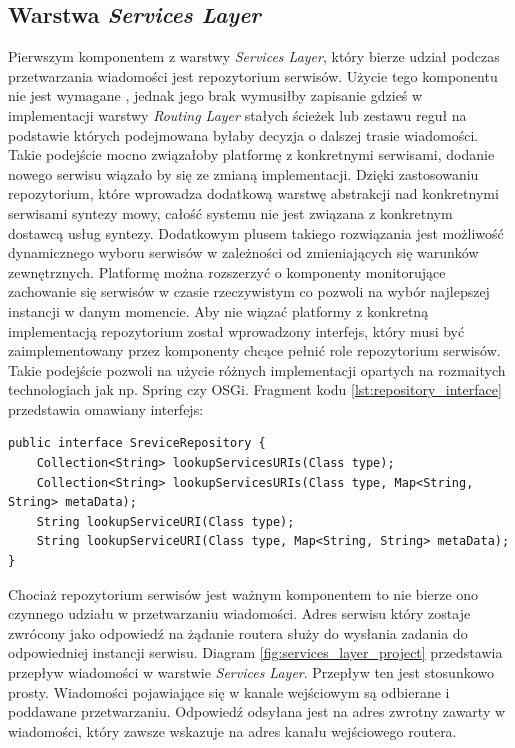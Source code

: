\subsection{Warstwa \textit{Services Layer}}

Pierwszym komponentem z warstwy \textit{Services Layer}, który bierze udział podczas przetwarzania wiadomości jest repozytorium serwisów. Użycie tego komponentu nie jest wymagane , jednak jego brak wymusiłby zapisanie gdzieś w implementacji warstwy \textit{Routing Layer} stałych ścieżek lub zestawu reguł na podstawie których podejmowana byłaby decyzja o dalszej trasie wiadomości. Takie podejście mocno związałoby platformę z konkretnymi serwisami, dodanie nowego serwisu wiązało by się ze zmianą implementacji. Dzięki zastosowaniu repozytorium, które wprowadza dodatkową warstwę abstrakcji nad konkretnymi serwisami syntezy mowy, całość systemu nie jest związana z konkretnym dostawcą usług syntezy. Dodatkowym plusem takiego rozwiązania jest możliwość dynamicznego wyboru serwisów w zależności od zmieniających się warunków zewnętrznych. Platformę można rozszerzyć o komponenty monitorujące zachowanie się serwisów w czasie rzeczywistym co pozwoli na wybór najlepszej instancji w danym momencie. 
Aby nie wiązać platformy z konkretną implementacją repozytorium został wprowadzony interfejs, który musi być zaimplementowany przez komponenty chcące pełnić role repozytorium serwisów. Takie podejście pozwoli na użycie różnych implementacji opartych na rozmaitych technologiach jak np. Spring czy OSGi. Fragment kodu \ref{lst:repository_interface} przedstawia omawiany interfejs:

\lstset{language=Java, tabsize=4, caption=Definicja interfejsu ISreviceRepository w języku Java.,label=lst:repository_interface}

\begin{center}
\begin{lstlisting}
public interface SreviceRepository {
	Collection<String> lookupServicesURIs(Class type);
	Collection<String> lookupServicesURIs(Class type, Map<String, String> metaData);
	String lookupServiceURI(Class type);
	String lookupServiceURI(Class type, Map<String, String> metaData);
}
\end{lstlisting}
\end{center}

Chociaż repozytorium serwisów jest ważnym komponentem to nie bierze ono czynnego udziału w przetwarzaniu wiadomości. Adres serwisu który zostaje zwrócony jako odpowiedź na żądanie routera służy do wysłania zadania do odpowiedniej instancji serwisu. Diagram \ref{fig:services_layer_project} przedstawia przepływ wiadomości w warstwie \textit{Services Layer}. Przepływ ten jest stosunkowo prosty. Wiadomości pojawiające się w kanale wejściowym są odbierane i poddawane przetwarzaniu. Odpowiedź odsyłana jest na adres zwrotny zawarty w wiadomości, który zawsze wskazuje na adres kanału wejściowego routera. 

